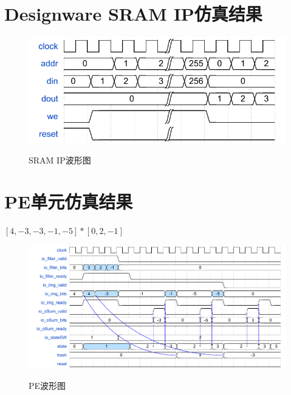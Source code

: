 \section{Designware SRAM IP仿真结果}
\begin{figure}[h]
    \centering
    \includegraphics{../pdf/sram_w.pdf}\\
    \caption{SRAM IP波形图}
\end{figure}

\section{PE单元仿真结果}
$[4,-3,-3,-1,-5] * [0,2,-1]$
\begin{figure}[h]
    \centering
    \includegraphics[scale=0.7]{../pdf/pe_w.pdf}\\
    \caption{PE波形图}
\end{figure}

